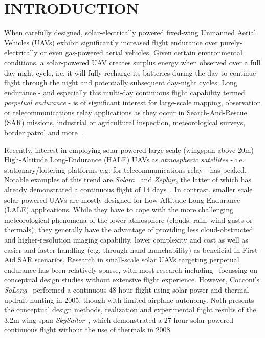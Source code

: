 \section{INTRODUCTION}


When carefully designed, solar-electrically powered fixed-wing Unmanned Aerial Vehicles (UAVs) exhibit significantly increased flight endurance over purely-electrically or even gas-powered aerial vehicles. Given certain environmental conditions, a solar-powered UAV creates surplus energy when observed over a full day-night cycle, i.e. it will fully recharge its batteries during the day to continue flight through the night and potentially subsequent day-night cycles. Long endurance - and especially this multi-day continuous flight capability termed \emph{perpetual endurance} - is of significant interest for large-scale mapping, observation or telecommunications relay applications as they occur in Search-And-Rescue (SAR) missions, industrial or agricultural inspection, meteorological surveys, border patrol and more~\cite{NASA_Pathfinder}.

Recently, interest in employing solar-powered large-scale (wingspan above 20m) High-Altitude Long-Endurance (HALE) UAVs as \emph{atmospheric satellites} - i.e. stationary/loitering platforms e.g. for telecommunications relay - has peaked. Notable examples of this trend are \textit{Solara}~\cite{IEEE_AtmosphericSatellites} and \textit{Zephyr}, the latter of which has already demonstrated a continuous flight of 14 days~\cite{QinetiQ_Zephyr14dayRecord}. In contrast, smaller scale solar-powered UAVs are mostly designed for Low-Altitude Long Endurance (LALE) applications. While they have to cope with the more challenging meteorological phenomena of the lower atmosphere (clouds, rain, wind gusts or thermals), they generally have the advantage of providing less cloud-obstructed and higher-resolution imaging capability, lower complexity and cost as well as easier and faster handling (e.g. through hand-launchability) as beneficial in First-Aid SAR scenarios. Research in small-scale solar UAVs targeting perpetual endurance has been relatively sparse, with most research including~\cite{Morton_ICRA2013} focussing on conceptual design studies without extensive flight experience. However, Cocconi's \textit{SoLong}~\cite{Cocconi_SoLong} performed a continuous 48-hour flight using solar power and thermal updraft hunting in 2005, though with limited airplane autonomy. Noth presents the conceptual design methods, realization and experimental flight results of the 3.2m wing span \textit{SkySailor}~\cite{Noth_PhD}, which demonstrated a 27-hour solar-powered continuous flight without the use of thermals in 2008. 

